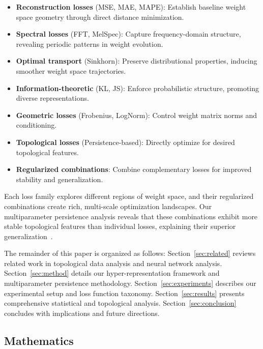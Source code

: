 \begin{itemize}
    \item \textbf{Reconstruction losses} (MSE, MAE, MAPE): Establish baseline weight space geometry through direct distance minimization.
    \item \textbf{Spectral losses} (FFT, MelSpec): Capture frequency-domain structure, revealing periodic patterns in weight evolution.
    \item \textbf{Optimal transport} (Sinkhorn): Preserve distributional properties, inducing smoother weight space trajectories.
    \item \textbf{Information-theoretic} (KL, JS): Enforce probabilistic structure, promoting diverse representations.
    \item \textbf{Geometric losses} (Frobenius, LogNorm): Control weight matrix norms and conditioning.
    \item \textbf{Topological losses} (Persistence-based): Directly optimize for desired topological features.
    \item \textbf{Regularized combinations}: Combine complementary losses for improved stability and generalization.
\end{itemize}

Each loss family explores different regions of weight space, and their regularized combinations create rich, multi-scale optimization landscapes. Our multiparameter persistence analysis reveals that these combinations exhibit more stable topological features than individual losses, explaining their superior generalization~\cite{birdalIntrinsicDimensionPersistent2021}.

The remainder of this paper is organized as follows: Section~\ref{sec:related} reviews related work in topological data analysis and neural network analysis. Section~\ref{sec:method} details our hyper-representation framework and multiparameter persistence methodology. Section~\ref{sec:experiments} describes our experimental setup and loss function taxonomy. Section~\ref{sec:results} presents comprehensive statistical and topological analysis. Section~\ref{sec:conclusion} concludes with implications and future directions.

\subsection{Mathematics}

